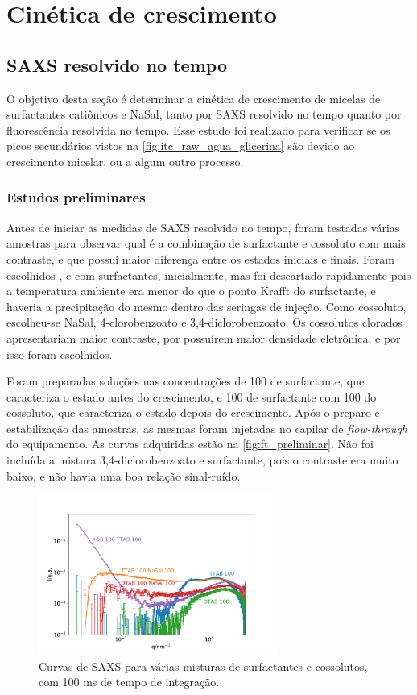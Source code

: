 	
\part{Cinética de crescimento}
	\chapter{SAXS resolvido no tempo}
	O objetivo desta seção é determinar a cinética de crescimento de micelas de surfactantes catiônicos e NaSal, tanto por SAXS resolvido no tempo quanto por fluorescência resolvida no tempo. Esse estudo foi realizado para verificar se os picos secundários vistos na \autoref{fig:itc_raw_agua_glicerina} são devido ao crescimento micelar, ou a algum outro processo.
	
	\section{Estudos preliminares} 
	Antes de iniciar as medidas de SAXS resolvido no tempo, foram testadas várias amostras para observar qual é a combinação de surfactante e cossoluto com mais contraste, e que possui maior diferença entre os estados iniciais e finais. Foram escolhidos \CTAB, \TTAB{} e \DTAB{} com surfactantes, inicialmente, mas \CTAB{} foi descartado rapidamente pois a temperatura ambiente era menor do que o ponto Krafft do surfactante, e haveria a precipitação do mesmo dentro das seringas de injeção. Como cossoluto, escolheu-se NaSal, 4-clorobenzoato e 3,4-diclorobenzoato. Os cossolutos clorados apresentariam maior contraste, por possuírem maior densidade eletrônica, e por isso foram escolhidos.
	
	Foram preparadas soluções nas concentrações de 100 \mM{} de surfactante, que caracteriza o estado antes do crescimento, e 100 \mM{} de surfactante com 100 \mM{} do cossoluto, que caracteriza o estado depois do crescimento. Após o preparo e estabilização das amostras, as mesmas foram injetadas no capilar de \emph{flow-through} do equipamento. As curvas adquiridas estão na \autoref{fig:ft_preliminar}. Não foi incluída a mistura 3,4-diclorobenzoato e surfactante, pois o contraste era muito baixo, e não havia uma boa relação sinal-ruído.
	
	\begin{figure}[h]
		\centering
		\includegraphics[width=0.7\textwidth]{imagens/saxs/FT_amostras}
		\caption{Curvas de SAXS para várias misturas de surfactantes e cossolutos, com 100 ms de tempo de integração.}
		\label{fig:ft_preliminar}
	\end{figure}

